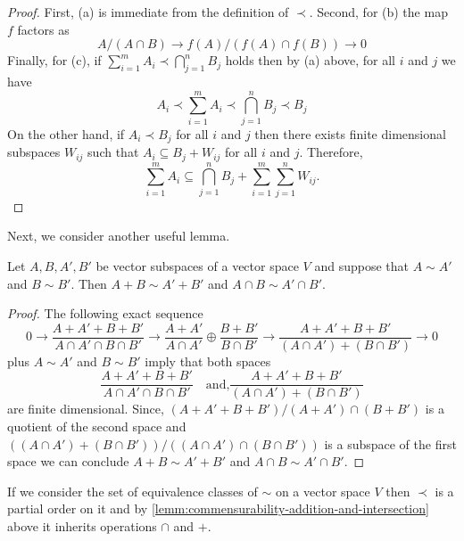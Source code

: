 \begin{proof}
	First, (a) is immediate from the definition of $\prec$. Second, for (b) the map $f$ factors as
	\[
		A/(A\cap B) \to f(A)/(f(A)\cap f(B)) \to 0
	\]
	Finally, for (c), if $\sum_{i=1}^{m} A_{i} \prec \bigcap_{j=1}^{n} B_{j}$ holds then by (a) above, for all $i$ and $j$ we have
	\[
		A_{i} \prec \sum_{i=1}^{m} A_{i} \prec \bigcap_{j=1}^{n} B_{j} \prec B_{j}
	\]
	On the other hand, if $A_{i} \prec B_{j}$ for all $i$ and $j$ then there exists finite dimensional subspaces $W_{ij}$ such that $A_{i} \subseteq B_{j} + W_{ij}$ for all $i$ and $j$. Therefore,
	\[
		\sum_{i=1}^{m} A_{i} \subseteq \bigcap_{j=1}^{n} B_{j} + \sum_{i=1}^{m} \sum_{j=1}^{n} W_{ij}.
	\]

\end{proof}
Next, we consider another useful lemma.
\begin{lemma}\label{lemm:commensurability-addition-and-intersection}
	Let $A,B,A',B'$ be vector subspaces of a vector space $V$ and suppose that $A \sim A'$ and $B \sim B'$. Then $A + B \sim A' + B'$ and $A \cap B \sim A' \cap B'$.
\end{lemma}
\begin{proof}
	The following exact sequence 
	\small
	\[
		0 \to \frac{A + A' + B + B'}{A\cap A'\cap B\cap B'} \to \frac{A + A'}{A \cap A'} \oplus \frac{B + B'}{B \cap B'} \to \frac{A + A' + B + B'}{(A\cap A') + (B\cap B')} \to 0
	\]
	\normalsize
	plus $A \sim A'$ and $B \sim B'$ imply that both spaces
	\[
		\frac{A + A' + B + B'}{A\cap A'\cap B\cap B'} \quad\text{and,}
		 \frac{A + A' + B + B'}{(A\cap A') + (B\cap B')}
	\]	
	are finite dimensional. Since, $(A + A' + B + B')/(A+A')\cap(B+B')$ is a quotient of the second space and $((A \cap A') + (B \cap B'))/((A\cap A')\cap(B\cap B'))$ is a subspace of the first space we can conclude $A + B \sim A' + B'$ and $A \cap B \sim A' \cap B'$.
\end{proof}
If we consider the set of equivalence classes of $\sim$ on a vector space $V$ then $\prec$ is a partial order on it and by \cref{lemm:commensurability-addition-and-intersection} above it inherits operations $\cap$ and $+$.
